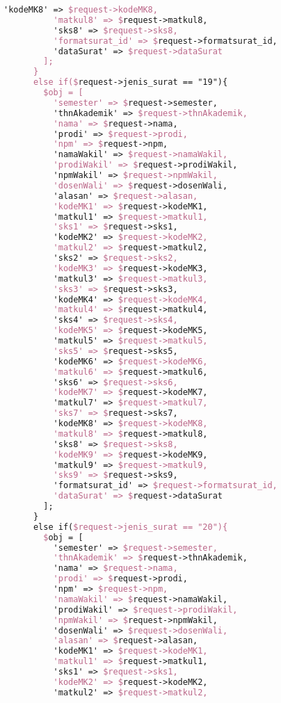 \begin{lstlisting}[language=tex,basicstyle=\tiny,caption=PesanansuratController.php]
          'kodeMK8' => $request->kodeMK8,
          'matkul8' => $request->matkul8,
          'sks8' => $request->sks8,
          'formatsurat_id' => $request->formatsurat_id,
          'dataSurat' => $request->dataSurat
        ];
      }
      else if($request->jenis_surat == "19"){
        $obj = [
          'semester' => $request->semester,
          'thnAkademik' => $request->thnAkademik,
          'nama' => $request->nama,
          'prodi' => $request->prodi,
          'npm' => $request->npm,
          'namaWakil' => $request->namaWakil,
          'prodiWakil' => $request->prodiWakil,
          'npmWakil' => $request->npmWakil,
          'dosenWali' => $request->dosenWali,
          'alasan' => $request->alasan,
          'kodeMK1' => $request->kodeMK1,
          'matkul1' => $request->matkul1,
          'sks1' => $request->sks1,
          'kodeMK2' => $request->kodeMK2,
          'matkul2' => $request->matkul2,
          'sks2' => $request->sks2,
          'kodeMK3' => $request->kodeMK3,
          'matkul3' => $request->matkul3,
          'sks3' => $request->sks3,
          'kodeMK4' => $request->kodeMK4,
          'matkul4' => $request->matkul4,
          'sks4' => $request->sks4,
          'kodeMK5' => $request->kodeMK5,
          'matkul5' => $request->matkul5,
          'sks5' => $request->sks5,
          'kodeMK6' => $request->kodeMK6,
          'matkul6' => $request->matkul6,
          'sks6' => $request->sks6,
          'kodeMK7' => $request->kodeMK7,
          'matkul7' => $request->matkul7,
          'sks7' => $request->sks7,
          'kodeMK8' => $request->kodeMK8,
          'matkul8' => $request->matkul8,
          'sks8' => $request->sks8,
          'kodeMK9' => $request->kodeMK9,
          'matkul9' => $request->matkul9,
          'sks9' => $request->sks9,
          'formatsurat_id' => $request->formatsurat_id,
          'dataSurat' => $request->dataSurat
        ];
      }
      else if($request->jenis_surat == "20"){
        $obj = [
          'semester' => $request->semester,
          'thnAkademik' => $request->thnAkademik,
          'nama' => $request->nama,
          'prodi' => $request->prodi,
          'npm' => $request->npm,
          'namaWakil' => $request->namaWakil,
          'prodiWakil' => $request->prodiWakil,
          'npmWakil' => $request->npmWakil,
          'dosenWali' => $request->dosenWali,
          'alasan' => $request->alasan,
          'kodeMK1' => $request->kodeMK1,
          'matkul1' => $request->matkul1,
          'sks1' => $request->sks1,
          'kodeMK2' => $request->kodeMK2,
          'matkul2' => $request->matkul2,

\end{lstlisting}
